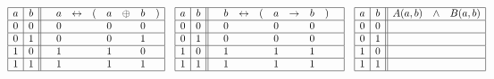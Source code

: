 \documentclass[12pt]{article}
\begin{document}
\begin{enumerate}[(a)]
 $$
 \hspace{-.4in}
\begin{array}{|c|c||cccccccc|}\hline
 a & b &  & a & \leftrightarrow & ( & a  &\oplus &  b & )  \\ \hline
 0 & 0 &&0&&& 0 && 0 &\\ \hline
 0 & 1 &&0&&& 0 && 1 &\\ \hline
 1 & 0 &&1&&& 1 && 0 &\\ \hline
 1 & 1 &&1&&& 1 && 1 &\\ \hline
 \end{array}
 \quad 
 \begin{array}{|c|c||ccccccccc|}\hline
 a & b &  & b & \leftrightarrow &  ( &a & \rightarrow  & b & ) & \\\hline
 0 & 0 &  & 0 &&& 0 && 0 &&\\\hline
 0 & 1 &  & 0 &&& 0 && 0 &&\\\hline
 1 & 0 &  & 1 &&& 1 && 1 &&\\\hline
 1 & 1 &  & 1 &&& 1 && 1 &&\\\hline
 \end{array}
 \quad 
 \begin{array}{|c|c||ccc|}\hline
 a & b &  A(a,b) &  \wedge  &B(a,b)  \\\hline
 0 & 0 &         &          &        \\\hline
 0 & 1 &         &          &        \\\hline
 1 & 0 &         &          &        \\\hline
 1 & 1 &         &          &        \\\hline
 \end{array}
 $$

\bigskip


\end{enumerate}
\end{document}
